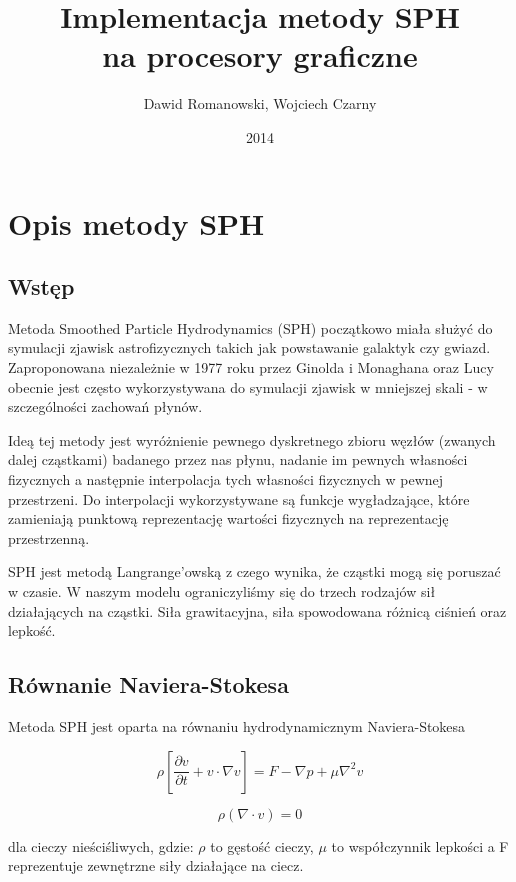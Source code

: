 \documentclass[polish, 12pt]{aghthesis}
\author{Dawid Romanowski, Wojciech Czarny}
\title{Implementacja metody SPH \\ na procesory graficzne}
\date{2014}
\begin{document}
\raggedbottom
\maketitle{}

\tableofcontents
\clearpage

	\section{Opis metody SPH}

		\subsection{Wstęp}
			
			Metoda Smoothed Particle Hydrodynamics (SPH) początkowo miała służyć do symulacji zjawisk astrofizycznych takich jak powstawanie galaktyk czy gwiazd. Zaproponowana niezależnie w 1977 roku przez Ginolda i Monaghana oraz Lucy obecnie jest często wykorzystywana do symulacji zjawisk w mniejszej skali - w szczególności zachowań płynów. 

			Ideą tej metody jest wyróżnienie pewnego dyskretnego zbioru węzłów (zwanych dalej cząstkami) badanego przez nas płynu, nadanie im pewnych własności fizycznych a następnie interpolacja tych własności fizycznych w pewnej przestrzeni. Do interpolacji wykorzystywane są funkcje wygładzające, które zamieniają punktową reprezentację wartości fizycznych na reprezentację przestrzenną.

			SPH jest metodą Langrange'owską z czego wynika, że cząstki mogą się poruszać w czasie. W naszym modelu ograniczyliśmy się do trzech rodzajów sił działających na cząstki. Siła grawitacyjna, siła spowodowana różnicą ciśnień oraz lepkość.

		\subsection{Równanie Naviera-Stokesa}

			Metoda SPH jest oparta na równaniu hydrodynamicznym Naviera-Stokesa

			\[{\rho}[\frac{\partial v}{\partial t} + v \cdot \nabla v ]= F - \nabla p + \mu \nabla^2 v \label{eq:navier-stokes} \tag{1}\]

			\[{\rho}(\nabla \cdot v)=0 \label{eq:continuity} \tag{2}\]

			dla cieczy nieściśliwych, gdzie: ${\rho}$ to gęstość cieczy, ${\mu}$ to współczynnik lepkości a F reprezentuje zewnętrzne siły działające na ciecz.
			
\end{document}
